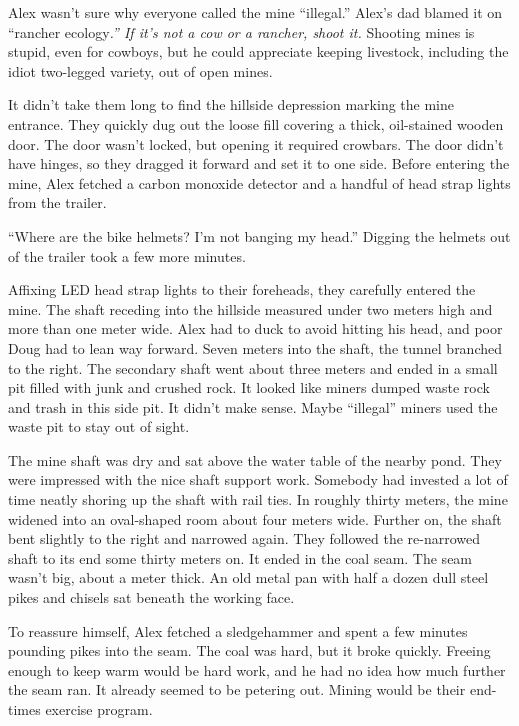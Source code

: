 Alex wasn't sure why everyone called the mine ``illegal.'' Alex's dad
blamed it on ``rancher ecology\emph{.'' If it's not a cow or a rancher,
shoot it.} Shooting mines is stupid, even for cowboys, but he could
appreciate keeping livestock, including the idiot two-legged variety,
out of open mines.

It didn't take them long to find the hillside depression marking the
mine entrance. They quickly dug out the loose fill covering a thick,
oil-stained wooden door. The door wasn't locked, but opening it required
crowbars. The door didn't have hinges, so they dragged it forward and
set it to one side. Before entering the mine, Alex fetched a carbon
monoxide detector and a handful of head strap lights from the trailer.

``Where are the bike helmets? I'm not banging my head.'' Digging the
helmets out of the trailer took a few more minutes.

Affixing LED head strap lights to their foreheads, they carefully
entered the mine. The shaft receding into the hillside measured under
two meters high and more than one meter wide. Alex had to duck to avoid
hitting his head, and poor Doug had to lean way forward. Seven meters
into the shaft, the tunnel branched to the right. The secondary shaft
went about three meters and ended in a small pit filled with junk and
crushed rock. It looked like miners dumped waste rock and trash in this
side pit. It didn't make sense. Maybe ``illegal'' miners used the waste
pit to stay out of sight.

The mine shaft was dry and sat above the water table of the nearby pond.
They were impressed with the nice shaft support work. Somebody had
invested a lot of time neatly shoring up the shaft with rail ties. In
roughly thirty meters, the mine widened into an oval-shaped room about
four meters wide. Further on, the shaft bent slightly to the right and
narrowed again. They followed the re-narrowed shaft to its end some
thirty meters on. It ended in the coal seam. The seam wasn't big, about
a meter thick. An old metal pan with half a dozen dull steel pikes and
chisels sat beneath the working face.

To reassure himself, Alex fetched a sledgehammer and spent a few minutes
pounding pikes into the seam. The coal was hard, but it broke quickly.
Freeing enough to keep warm would be hard work, and he had no idea how
much further the seam ran. It already seemed to be petering out. Mining
would be their end-times exercise program.

